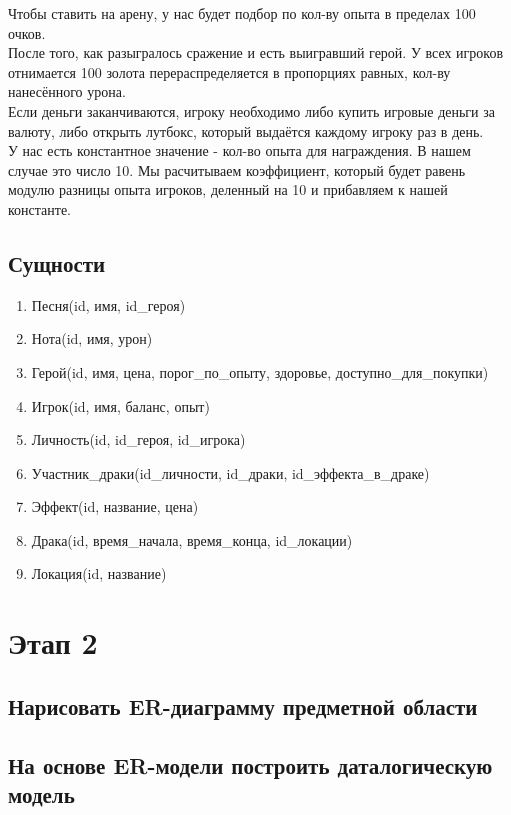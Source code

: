 Чтобы ставить на арену, у нас будет подбор по кол-ву опыта в пределах 100 очков.\\
    
После того, как разыгралось сражение и есть выигравший герой. У всех игроков отнимается 100 золота перераспределяется в пропорциях равных, кол-ву нанесённого урона. \\

Если деньги заканчиваются, игроку необходимо либо купить игровые деньги за валюту, либо открыть лутбокс, который выдаётся каждому игроку раз в день. \\

У нас есть константное значение - кол-во опыта для награждения. В нашем случае это число 10. Мы расчитываем коэффициент, который будет равень модулю разницы опыта игроков, деленный на 10 и прибавляем к нашей константе.

\subsection*{Сущности}


\begin{enumerate}
    \item Песня(id, имя, id\_героя)
    \item Нота(id, имя, урон)
    \item Герой(id, имя, цена, порог\_по\_опыту, здоровье, доступно\_для\_покупки)
    \item Игрок(id, имя, баланс, опыт)
    \item Личность(id, id\_героя, id\_игрока)
    \item Участник\_драки(id\_личности, id\_драки, id\_эффекта\_в\_драке)
    \item Эффект(id, название, цена)
    \item Драка(id, время\_начала, время\_конца, id\_локации)
    \item Локация(id, название)
\end{enumerate}

\section*{Этап 2}


\subsection*{Нарисовать ER-диаграмму предметной области}



\subsection*{На основе ER-модели построить даталогическую модель}


